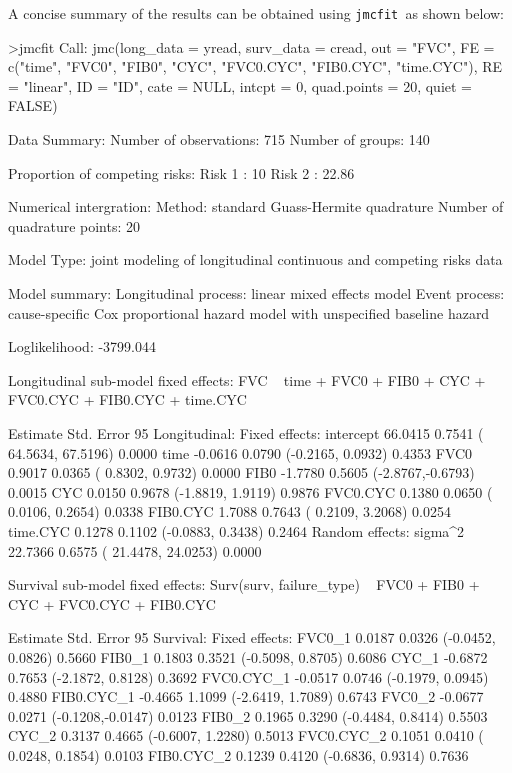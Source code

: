 A concise summary of the results can be obtained using \texttt{jmcfit }as shown below:
\begin{example}
>jmcfit
Call:
 jmc(long_data = yread, surv_data = cread, out = "FVC",
FE = c("time", "FVC0", "FIB0", "CYC", "FVC0.CYC", "FIB0.CYC", "time.CYC"),
RE = "linear", ID = "ID", cate = NULL, intcpt = 0, quad.points = 20, quiet = FALSE)

Data Summary:
Number of observations: 715
Number of groups: 140

Proportion of competing risks:
Risk 1 : 10 %
Risk 2 : 22.86 %

Numerical intergration:
Method: standard Guass-Hermite quadrature
Number of quadrature points:  20

Model Type: joint modeling of longitudinal continuous and competing risks data

Model summary:
Longitudinal process: linear mixed effects model
Event process: cause-specific Cox proportional hazard model with unspecified baseline hazard

Loglikelihood:  -3799.044

Longitudinal sub-model fixed effects:  FVC ~ time + FVC0 + FIB0 + CYC + FVC0.CYC + FIB0.CYC + time.CYC

                  Estimate   Std. Error       95%
Longitudinal:
 Fixed effects:
  intercept      66.0415      0.7541      ( 64.5634, 67.5196)      0.0000
  time           -0.0616      0.0790      (-0.2165, 0.0932)      0.4353
  FVC0           0.9017       0.0365      ( 0.8302, 0.9732)      0.0000
  FIB0           -1.7780      0.5605      (-2.8767,-0.6793)      0.0015
  CYC            0.0150       0.9678      (-1.8819, 1.9119)      0.9876
  FVC0.CYC       0.1380       0.0650      ( 0.0106, 0.2654)      0.0338
  FIB0.CYC       1.7088       0.7643      ( 0.2109, 3.2068)      0.0254
  time.CYC       0.1278       0.1102      (-0.0883, 0.3438)      0.2464
Random effects:
  sigma^2         22.7366       0.6575  ( 21.4478, 24.0253)      0.0000

Survival sub-model fixed effects:  Surv(surv, failure_type) ~ FVC0 + FIB0 + CYC + FVC0.CYC + FIB0.CYC

                  Estimate   Std. Error       95%
Survival:
 Fixed effects:
  FVC0_1         0.0187       0.0326      (-0.0452, 0.0826)      0.5660
  FIB0_1         0.1803       0.3521      (-0.5098, 0.8705)      0.6086
  CYC_1          -0.6872      0.7653      (-2.1872, 0.8128)      0.3692
  FVC0.CYC_1     -0.0517      0.0746      (-0.1979, 0.0945)      0.4880
  FIB0.CYC_1     -0.4665      1.1099      (-2.6419, 1.7089)      0.6743
  FVC0_2         -0.0677      0.0271      (-0.1208,-0.0147)      0.0123
  FIB0_2         0.1965       0.3290      (-0.4484, 0.8414)      0.5503
  CYC_2          0.3137       0.4665      (-0.6007, 1.2280)      0.5013
  FVC0.CYC_2     0.1051       0.0410      ( 0.0248, 0.1854)      0.0103
  FIB0.CYC_2     0.1239       0.4120      (-0.6836, 0.9314)      0.7636


\end{example}
